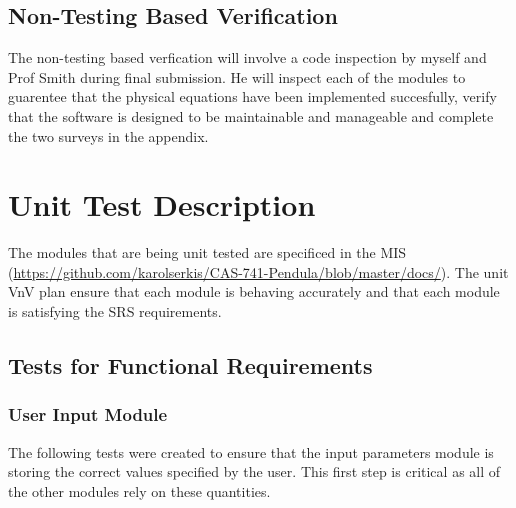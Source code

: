 \documentclass[12pt, titlepage]{article}
\begin{document}

\subsection{Non-Testing Based Verification}

The non-testing based verfication  will involve a code inspection by myself and
Prof Smith during final submission. He will inspect each of the modules to
guarentee  that the 
physical equations have been implemented succesfully,  verify that the software 
is designed to be maintainable and manageable and complete the 
two surveys in the appendix.\\

\section{Unit Test Description}

The modules that are being unit tested are specificed in the MIS 
(\url{https://github.com/karolserkis/CAS-741-Pendula/blob/master/docs/}). The unit VnV plan 
ensure that each module is behaving accurately and that each module is 
satisfying the SRS requirements.\\ 
	
\subsection{Tests for Functional Requirements}

\subsubsection{User Input Module}

The following tests were created to ensure that the input parameters module is 
storing the correct values specified by the user. This first step is critical 
as all of the other modules rely on these quantities.
\end{document}
